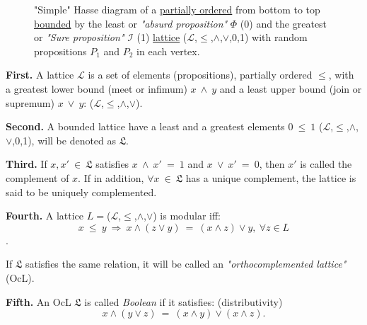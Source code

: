 \documentclass[12pt]{article}
\begin{document}
\begin{figure}[ht!]
\centering
{}

\caption{{\footnotesize "Simple" Hasse diagram of a \underline{partially ordered} from bottom to top \underline{bounded} by the least or \textit{"absurd proposition"} \textbf{$\Phi$} (0) and the greatest or \textit{"Sure proposition"} \textbf{$\mathcal{I}$} (1) \underline{lattice} ($\mathcal{L}$,$\leq$,$\land$,$\lor$,0,1) with random propositions $P_1$ and $P_2$ in each vertex.}}\label{lattice}
\end{figure}

\begin{itshape}
\textbf{First.} A lattice $\mathcal{L}$ is a set of elements (propositions), partially ordered $\leq$, with a greatest lower bound (meet or infimum) $x~\land ~y$ and a least upper bound (join or supremum) $x~\lor ~y$: ($\mathcal{L}$,$\leq$,$\land$,$\lor$).

\textbf{Second.} A bounded lattice have a least and a greatest elements $0~\leq~1$ ($\mathcal{L}$,$\leq$,$\land$,$\lor$,0,1), will be denoted as $\mathfrak{L}$.

\textbf{Third.} If $x,x'~\in~\mathfrak{L}$ satisfies $x~\land~x'~=~1$ and $x~\lor~x'~=~0$, then $x'$ is called the complement of $x$. If in addition, $\forall x~\in~\mathfrak{L}$ has a unique complement, the lattice is said to be uniquely complemented.

\textbf{Fourth.} A lattice $L=$($\mathcal{L}$,$\leq$,$\land$,$\lor$) is modular iff: 
$$x~\leq~y~\Rightarrow~x\land(z \lor y)~=~(x \land z)\lor y,~\forall z \in L$$.

If $\mathfrak{L}$ satisfies the same relation, it will be called an \textit{"orthocomplemented lattice"} (OcL).

\textbf{Fifth.} An OcL $\mathfrak{L}$ is called \textit{Boolean} if it satisfies: (distributivity) 
\begin{equation}
x\land(y \lor z)~=~(x \land y)\lor(x \land z).\label{equiv}
\end{equation}
\end{itshape}
\vspace{-0.9cm}
\end{document}
